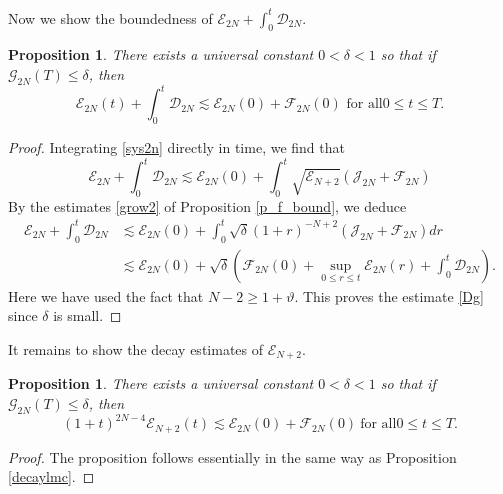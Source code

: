 \documentclass[a4paper,reqno,11pt]{amsart}
\numberwithin{equation}{section}
\providecommand{\se}[1]{\mathcal{E}_{#1}}
\newtheorem{prop}[lem]{Proposition}
\begin{document}
 Now we show the boundedness of $\mathcal{E}_{2N} +\int_0^t\mathcal{D}_{2N} $.

\begin{prop} \label{Dgle}
There exists a universal constant $0<\delta<1$ so that if $\mathcal{G}_{2N}(T)\le\delta$, then
\begin{equation}\label{Dg}
\mathcal{E}_{2N} (t)+\int_0^t\mathcal{D}_{2N} \lesssim
\mathcal{E}_{2N} (0) + \mathcal{F}_{2N}(0)  \text{ for all
}0\le t\le T.
\end{equation}
\end{prop}
\begin{proof}
Integrating \eqref{sys2n} directly in time, we find that
\begin{equation}
  {\mathcal{E}}_{2N}
+ \int_0^t{\mathcal{D}}_{2N}
{\lesssim} {\mathcal{E}}_{2N}(0)+\int_0^t \sqrt{ \se{N+2}  }(  \mathcal{J}_{2N} +{\mathcal{F}_{2N}})
\end{equation}
By the estimates \eqref{grow2} of Proposition \ref{p_f_bound}, we deduce
\begin{equation}
\begin{split}
  {\mathcal{E}}_{2N}
+ \int_0^t{\mathcal{D}}_{2N}
&{\lesssim} {\mathcal{E}}_{2N}(0)+ \int_0^t \sqrt{\delta}(1+r)^{-N+2}(  \mathcal{J}_{2N} +{\mathcal{F}_{2N}})dr
\\& {\lesssim} {\mathcal{E}}_{2N}(0)+ \sqrt{ \delta } \left({\mathcal{F}_{2N}}(0)+  \sup_{0\le r\le t}\mathcal{E}_{2N}(r)+ \int_0^t \mathcal{D}_{2N}\right)
.
 \end{split}
\end{equation}
Here we have used the fact that $N-2\ge 1+\vartheta$. This proves the estimate \eqref{Dg} since $\delta$ is small.
\end{proof}

It remains to show the decay estimates of
$\mathcal{E}_{N+2}$.

\begin{prop} \label{decaylm}
There exists a universal constant $0<\delta<1$ so that if $\mathcal{G}_{2N}(T)\le\delta$, then
\begin{equation}\label{n+2}
(1+t)^{2N-4} \mathcal{E}_{N+2} (t)\lesssim
\mathcal{E}_{2N} (0)+ \mathcal{F}_{2N}(0) \ \text{for all
}0\le t\le T.
\end{equation}
\end{prop}
\begin{proof}
The proposition follows essentially in the same way as Proposition \ref{decaylmc}.
\end{proof}
\end{document}
